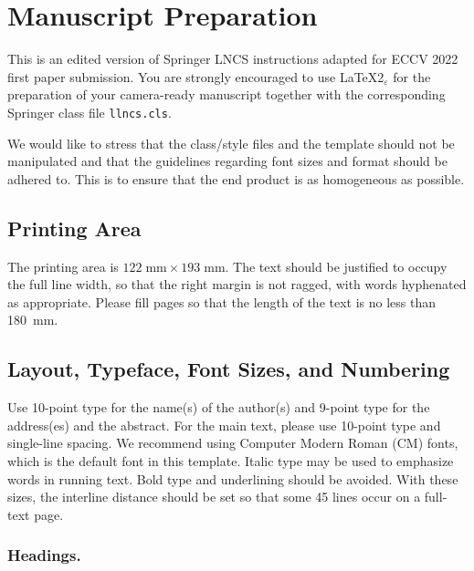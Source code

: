 \documentclass[runningheads]{llncs}
\begin{document}
\section{Manuscript Preparation}

This is an edited version of Springer LNCS instructions adapted
for ECCV 2022 first paper submission.
You are strongly encouraged to use \LaTeX2$_\varepsilon$ for the
preparation of your
camera-ready manuscript together with the corresponding Springer
class file \verb+llncs.cls+.

We would like to stress that the class/style files and the template
should not be manipulated and that the guidelines regarding font sizes
and format should be adhered to. This is to ensure that the end product
is as homogeneous as possible.

\subsection{Printing Area}
The printing area is $122  \; \mbox{mm} \times 193 \;
\mbox{mm}$.
The text should be justified to occupy the full line width,
so that the right margin is not ragged, with words hyphenated as
appropriate. Please fill pages so that the length of the text
is no less than 180~mm.

\subsection{Layout, Typeface, Font Sizes, and Numbering}
Use 10-point type for the name(s) of the author(s) and 9-point type for
the address(es) and the abstract. For the main text, please use 10-point
type and single-line spacing.
We recommend using Computer Modern Roman (CM) fonts, which is the default font in this template.
Italic type may be used to emphasize words in running text. Bold
type and underlining should be avoided.
With these sizes, the interline distance should be set so that some 45
lines occur on a full-text page.

\subsubsection{Headings.}
\end{document}
